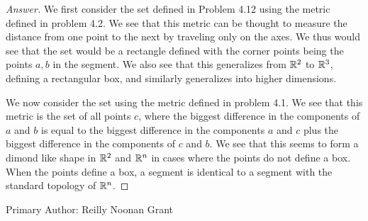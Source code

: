 \begin{proof}[Answer]
  We first consider the set defined in Problem 4.12 using the metric
  defined in problem 4.2. We see that this metric can be thought to
  measure the distance from one point to the next by traveling only 
  on the axes. We thus would see that the set would be a rectangle
  defined with the corner points being the points $a,b$ in the
  segment. We also see that this generalizes from $\mathbb{R}^2$ to $\mathbb{R}^3$,
  defining a rectangular box, and similarly generalizes into higher
  dimensions.

  We now consider the set using the metric defined in problem 4.1. We
  see that this metric is the set of all points $c$, where the biggest
  difference in the components of $a$ and $b$ is equal to the biggest
  difference in the components $a$ and $c$ plus the biggest difference in the
  components of $c$ and $b$. We see that this seems to form a dimond
  like shape in $\mathbb{R}^2$ and $\mathbb{R}^n$ in cases where the points do not
  define a box. When the points define a box, a segment is identical
  to a segment with the standard topology of $\mathbb{R}^n$.
\end{proof}

Primary Author: Reilly Noonan Grant